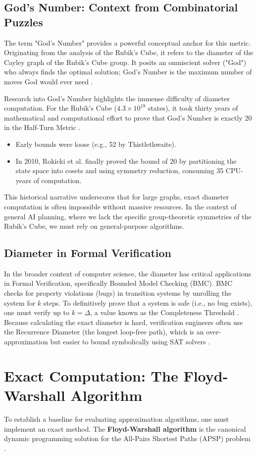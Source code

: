 \documentclass[12pt,a4paper]{report}
\begin{document}
\subsection{God's Number: Context from Combinatorial Puzzles}
The term "God's Number" provides a powerful conceptual anchor for this metric. Originating from the analysis of the Rubik's Cube, it refers to the diameter of the Cayley graph of the Rubik's Cube group. It posits an omniscient solver ("God") who always finds the optimal solution; God's Number is the maximum number of moves God would ever need \cite{mathworld}.

Research into God's Number highlights the immense difficulty of diameter computation. For the Rubik's Cube ($4.3 \times 10^{19}$ states), it took thirty years of mathematical and computational effort to prove that God's Number is exactly 20 in the Half-Turn Metric \cite{siam}.
\begin{itemize}
    \item Early bounds were loose (e.g., 52 by Thistlethwaite).
    \item In 2010, Rokicki et al. finally proved the bound of 20 by partitioning the state space into cosets and using symmetry reduction, consuming 35 CPU-years of computation.
\end{itemize}
This historical narrative underscores that for large graphs, exact diameter computation is often impossible without massive resources. In the context of general AI planning, where we lack the specific group-theoretic symmetries of the Rubik's Cube, we must rely on general-purpose algorithms.

\subsection{Diameter in Formal Verification}
In the broader context of computer science, the diameter has critical applications in Formal Verification, specifically Bounded Model Checking (BMC). BMC checks for property violations (bugs) in transition systems by unrolling the system for $k$ steps. To definitively prove that a system is safe (i.e., no bug exists), one must verify up to $k = \Delta$, a value known as the Completeness Threshold \cite{compthresh}. Because calculating the exact diameter is hard, verification engineers often use the Recurrence Diameter (the longest loop-free path), which is an over-approximation but easier to bound symbolically using SAT solvers \cite{kroening05}.

\section{Exact Computation: The Floyd-Warshall Algorithm}
To establish a baseline for evaluating approximation algorithms, one must implement an exact method. The \textbf{Floyd-Warshall algorithm} is the canonical dynamic programming solution for the All-Pairs Shortest Paths (APSP) problem \cite{finalroundFW}.
\end{document}
